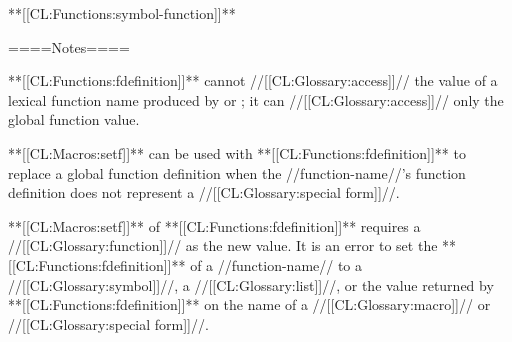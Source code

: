 **[[CL:Functions:symbol-function]]**

====Notes====

**[[CL:Functions:fdefinition]]** cannot //[[CL:Glossary:access]]// the value of a lexical function name produced by  or ; it can //[[CL:Glossary:access]]// only the global function value.

**[[CL:Macros:setf]]** can be used with **[[CL:Functions:fdefinition]]** to replace a global function definition when the //function-name//'s function definition does not represent a //[[CL:Glossary:special form]]//.

**[[CL:Macros:setf]]** of **[[CL:Functions:fdefinition]]** requires a //[[CL:Glossary:function]]// as the new value. It is an error to set the **[[CL:Functions:fdefinition]]** of a //function-name// to a //[[CL:Glossary:symbol]]//, a //[[CL:Glossary:list]]//, or the value returned by **[[CL:Functions:fdefinition]]** on the name of a //[[CL:Glossary:macro]]// or //[[CL:Glossary:special form]]//.



    

